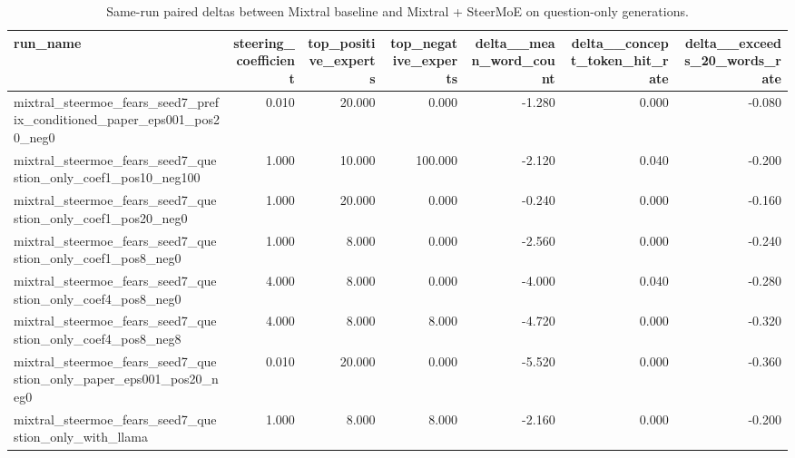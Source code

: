 \begin{table}[ht]
  \centering
  \caption{Same-run paired deltas between Mixtral baseline and Mixtral + SteerMoE on question-only generations.}
  \label{tab:headline_delta}
\begin{tabular}{lrrrrrr}
\toprule
run\_name & steering\_coefficient & top\_positive\_experts & top\_negative\_experts & delta\_\_mean\_word\_count & delta\_\_concept\_token\_hit\_rate & delta\_\_exceeds\_20\_words\_rate \\
\midrule
mixtral\_steermoe\_fears\_seed7\_prefix\_conditioned\_paper\_eps001\_pos20\_neg0 & 0.010 & 20.000 & 0.000 & -1.280 & 0.000 & -0.080 \\
mixtral\_steermoe\_fears\_seed7\_question\_only\_coef1\_pos10\_neg100 & 1.000 & 10.000 & 100.000 & -2.120 & 0.040 & -0.200 \\
mixtral\_steermoe\_fears\_seed7\_question\_only\_coef1\_pos20\_neg0 & 1.000 & 20.000 & 0.000 & -0.240 & 0.000 & -0.160 \\
mixtral\_steermoe\_fears\_seed7\_question\_only\_coef1\_pos8\_neg0 & 1.000 & 8.000 & 0.000 & -2.560 & 0.000 & -0.240 \\
mixtral\_steermoe\_fears\_seed7\_question\_only\_coef4\_pos8\_neg0 & 4.000 & 8.000 & 0.000 & -4.000 & 0.040 & -0.280 \\
mixtral\_steermoe\_fears\_seed7\_question\_only\_coef4\_pos8\_neg8 & 4.000 & 8.000 & 8.000 & -4.720 & 0.000 & -0.320 \\
mixtral\_steermoe\_fears\_seed7\_question\_only\_paper\_eps001\_pos20\_neg0 & 0.010 & 20.000 & 0.000 & -5.520 & 0.000 & -0.360 \\
mixtral\_steermoe\_fears\_seed7\_question\_only\_with\_llama & 1.000 & 8.000 & 8.000 & -2.160 & 0.000 & -0.200 \\
\bottomrule
\end{tabular}

\end{table}
